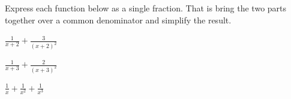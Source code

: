 
\begin{problem}
\item Express each function below as a single fraction. That is bring
  the two parts together over a common denominator and simplify the
  result.
  \begin{subproblem}
  \item ${\displaystyle \frac{1}{x+2} + \frac{3}{(x+2)^2}}$
    \vfill
  \item ${\displaystyle \frac{1}{x+3} + \frac{2}{(x+3)^2}}$
    \vfill
  \item ${\displaystyle \frac{1}{x} + \frac{1}{x^2} + \frac{1}{x^3}}$
    \vfill
  \end{subproblem}
\end{problem}

